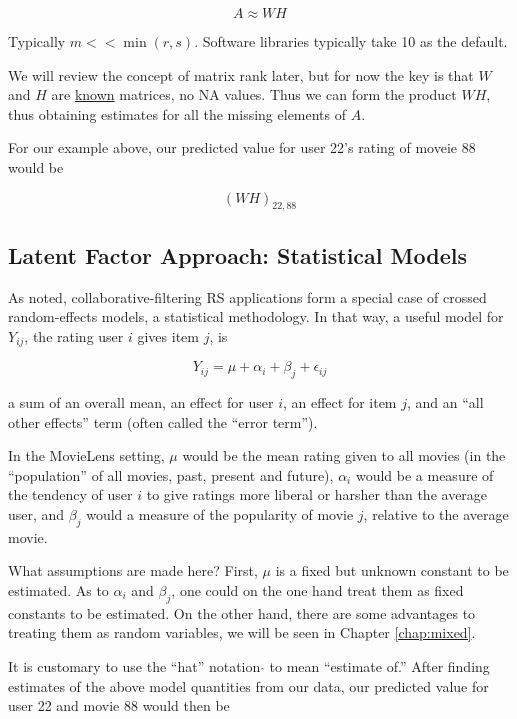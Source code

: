 \begin{equation}
A \approx WH
\end{equation}

Typically $m << \min(r,s)$.  Software libraries typically take 10 as the
default.

We will review the concept of matrix rank later, but for now the key is
that $W$ and $H$ are \underline{known} matrices, no NA values.  Thus we
can form the product $WH$, thus obtaining estimates for all the missing
elements of $A$.

For our example above, our predicted value for user 22's rating of
moveie 88 would be

\begin{equation}
(WH)_{22,88}
\end{equation}

\subsection{Latent Factor Approach: Statistical Models}

As noted, collaborative-filtering RS applications form a special case of
crossed random-effects models, a statistical methodology.  In that way,
a useful model for $Y_{ij}$, the rating user $i$ gives item $j$, is

\begin{equation}
Y_{ij} = \mu + \alpha_i + \beta_j + \epsilon_{ij}
\end{equation}

a sum of an overall mean, an effect for user $i$, an effect for item
$j$, and an ``all other effects'' term (often called the ``error
term'').

In the MovieLens setting, $\mu$ would be the mean rating given to all
movies (in the ``population'' of all movies, past, present and future),
$\alpha_i$ would be a measure of the tendency of user $i$ to give
ratings more liberal or harsher than the average user, and $\beta_j$
would a measure of the popularity of movie $j$, relative to the average
movie.

What assumptions are made here?  First, $\mu$ is a fixed but unknown
constant to be estimated.  As to $\alpha_i$ and $\beta_j$, one could on
the one hand treat them as fixed constants to be estimated.  On the
other hand, there are some advantages to treating them as random
variables, we will be seen in Chapter \ref{chap:mixed}.

It is customary to use the ``hat'' notation $\widehat{}$ to mean
``estimate of.''  After finding estimates of the above model quantities
from our data, our predicted value for user 22 and movie 88 would then
be

